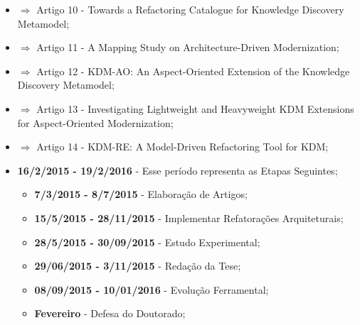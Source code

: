\begin{itemize}
\item $\Rightarrow$ Artigo 10 - Towards a Refactoring Catalogue for Knowledge Discovery Metamodel;
\item $\Rightarrow$ Artigo 11 - A Mapping Study on Architecture-Driven Modernization;
\item $\Rightarrow$ Artigo 12 - KDM-AO: An Aspect-Oriented Extension of the Knowledge Discovery Metamodel;
\item $\Rightarrow$ Artigo 13 - Investigating Lightweight and Heavyweight KDM Extensions for Aspect-Oriented Modernization;
\item $\Rightarrow$ Artigo 14 - KDM-RE: A Model-Driven Refactoring Tool for KDM;

\item \textbf{16/2/2015 - 19/2/2016} - Esse período representa as Etapas Seguintes;

\begin{itemize}
	\item \textbf{7/3/2015 - 8/7/2015} - Elaboração de Artigos;
	\item \textbf{15/5/2015 - 28/11/2015} - Implementar Refatorações Arquiteturais;
	\item \textbf{28/5/2015 - 30/09/2015} - Estudo Experimental;
	\item \textbf{29/06/2015 - 3/11/2015} - Redação da Tese;
	\item \textbf{08/09/2015 - 10/01/2016} - Evolução Ferramental;
	\item \textbf{Fevereiro} - Defesa do Doutorado;
\end{itemize}

\end{itemize}



